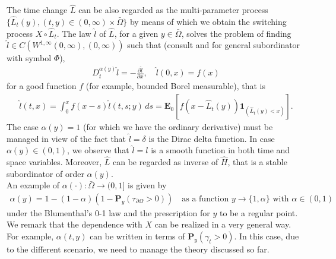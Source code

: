 \documentclass[11pt,a4paper]{article}
\begin{document}
The time change $\hat{L}$ can be also regarded as the multi-parameter process $\{\hat{L}_t(y), (t,y) \in (0, \infty) \times \bar{\Omega} \}$ by means of which we obtain the switching process $X \circ \hat{L}_t$. The law $\hat{l}$ of $\hat{L}$, for a given $y \in \bar{\Omega}$, solves the problem of finding $\hat{l} \in C(W^{1, \infty}(0,\infty), (0, \infty))$ such that (consult \cite[Section 2]{Dov22} and \cite[Section 2]{ColDov} for general subordinator with symbol $\Phi$),
\begin{align*}
D^{\alpha(y)}_t \hat{l} = - \frac{\partial \hat{l}}{\partial x}, \quad \hat{l}(0,x) = f(x)
\end{align*} 
for a good function $f$ (for example, bounded Borel measurable), that is
\begin{align*}
\hat{l}(t,x) = \int_0^x f(x-s) \hat{l}(t,s;y)\, ds = \mathbf{E}_0 \left[f(x - \hat{L}_t(y)) \mathbf{1}_{(\hat{L}_t(y) < x)} \right].
\end{align*}
The case $\alpha(y)=1$ (for which we have the ordinary derivative) must be managed in view of the fact that $\hat{l}=\delta$ is the Dirac delta function. In case $\alpha(y) \in (0,1)$, we observe that $\hat{l}=l$ is a smooth function in both time and space variables. Moreover, $\hat{L}$ can be regarded as inverse of $\hat{H}$, that is a stable subordinator of order $\alpha(y)$.\\

An example of $\alpha(\cdot) : \bar{\Omega} \to (0,1]$ is given by
\begin{align*}
\alpha(y) = 1 - (1-\alpha) (1 - \mathbf{P}_y(\tau_{\partial \Omega} > 0)) \quad \textrm{as a function $y \to \{1, \alpha\}$ with $\alpha \in (0,1)$}  
\end{align*} 
under the Blumenthal’s 0-1 law and the prescription for $y$ to be a regular point. We remark that the dependence with $X$ can be realized in a very general way. For example,  $\alpha(t,y)$ can be written in terms of $\mathbf{P}_y(\gamma_t >0)$. In this case, due to the different scenario, we need to manage the theory discussed so far.\\
\end{document}
